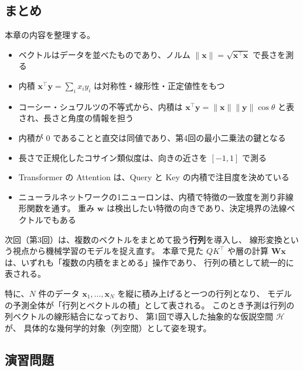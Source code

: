 \subsection{まとめ}

本章の内容を整理する。

\begin{itemize}
  \item ベクトルはデータを並べたものであり、ノルム $\|\bm{x}\| = \sqrt{\bm{x}^\top \bm{x}}$ で長さを測る
  \item 内積 $\bm{x}^\top \bm{y} = \sum_i x_i y_i$ は対称性・線形性・正定値性をもつ
  \item コーシー・シュワルツの不等式から、内積は
    $\bm{x}^\top \bm{y} = \|\bm{x}\|\|\bm{y}\|\cos\theta$ と表され、長さと角度の情報を担う
  \item 内積が $0$ であることと直交は同値であり、第4回の最小二乗法の鍵となる
  \item 長さで正規化したコサイン類似度は、向きの近さを $[-1, 1]$ で測る
  \item Transformer の Attention は、Query と Key の内積で注目度を決めている
  \item ニューラルネットワークの1ニューロンは、内積で特徴の一致度を測り非線形関数を通す。
    重み $\bm{w}$ は検出したい特徴の向きであり、決定境界の法線ベクトルでもある
\end{itemize}

次回（第3回）は、複数のベクトルをまとめて扱う\textbf{行列}を導入し、
線形変換という視点から機械学習のモデルを捉え直す。
本章で見た $QK^\top$ や層の計算 $\bm{W}\bm{x}$ は、いずれも「複数の内積をまとめる」操作であり、
行列の積として統一的に表される。

特に、$N$ 件のデータ $\bm{x}_1, \ldots, \bm{x}_N$ を縦に積み上げると一つの行列となり、
モデルの予測全体が「行列とベクトルの積」として表される。
このとき予測は行列の列ベクトルの線形結合になっており、
第1回で導入した抽象的な仮説空間 $\mathcal{H}$ が、
具体的な幾何学的対象（列空間）として姿を現す。


\subsection{演習問題}

